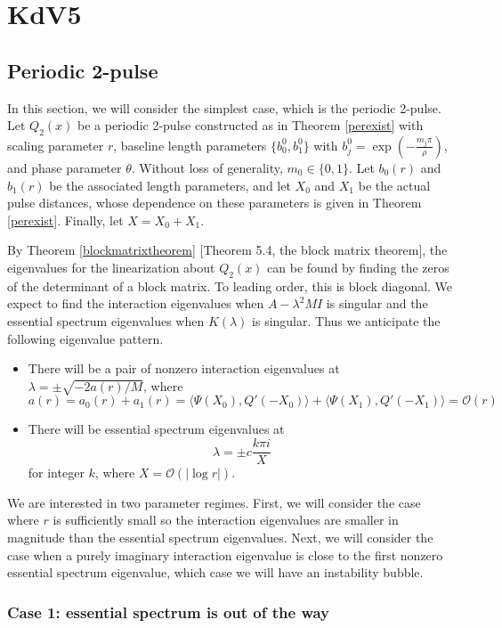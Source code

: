 \documentclass[thesis.tex]{subfiles}
\begin{document}
\chapter{KdV5}

\section{Periodic 2-pulse}

In this section, we will consider the simplest case, which is the periodic 2-pulse. Let $Q_2(x)$ be a periodic 2-pulse constructed as in Theorem \ref{perexist} with scaling parameter $r$, baseline length parameters $\{b_0^0, b_1^0 \}$ with $b_j^0 = \exp\left(-\frac{m_j \pi}{\rho}\right)$, and phase parameter $\theta$. Without loss of generality, $m_0 \in \{0, 1\}$. Let $b_0(r)$ and $b_1(r)$ be the associated length parameters, and let $X_0$ and $X_1$ be the actual pulse distances, whose dependence on these parameters is given in Theorem \ref{perexist}. Finally, let $X = X_0 + X_1$.  

By Theorem \ref{blockmatrixtheorem} [Theorem 5.4, the block matrix theorem], the eigenvalues for the linearization about $Q_2(x)$ can be found by finding the zeros of the determinant of a block matrix. To leading order, this is block diagonal. We expect to find the interaction eigenvalues when $A - \lambda^2 M I$ is singular and the essential spectrum eigenvalues when $K(\lambda)$ is singular. Thus we anticipate the following eigenvalue pattern.
\begin{itemize}
\item There will be a pair of nonzero interaction eigenvalues at $\lambda = \pm \sqrt{-2a(r)/M}$, where 
\[
a(r) = a_0(r) + a_1(r) = \langle \Psi(X_0), Q'(-X_0) \rangle + \langle \Psi(X_1), Q'(-X_1) \rangle = \mathcal{O}(r)
\]
\item There will be essential spectrum eigenvalues at
\[
\lambda = \pm c \frac{k \pi i}{X}
\]
for integer $k$, where $X = \mathcal{O}(|\log r|)$.
\end{itemize}

We are interested in two parameter regimes. First, we will consider the case where $r$ is sufficiently small so the interaction eigenvalues are smaller in magnitude than the essential spectrum eigenvalues. Next, we will consider the case when a purely imaginary interaction eigenvalue is close to the first nonzero essential spectrum eigenvalue, which case we will have an instability bubble.

\subsection{Case 1: essential spectrum is out of the way}\label{section:2pernobubble}
\end{document}
